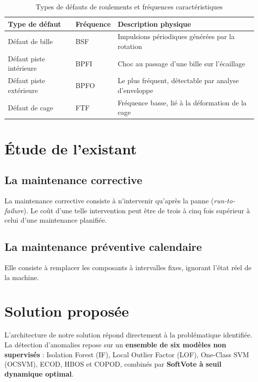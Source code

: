 \documentclass[12pt,a4paper]{report}
\begin{document}
\begin{table}[h]
\centering
\caption{Types de défauts de roulements et fréquences caractéristiques}
\label{tab:defauts_roulements}
\begin{tabular}{lll}
\toprule
\textbf{Type de défaut} & \textbf{Fréquence} & \textbf{Description physique} \\
\midrule
Défaut de bille        & BSF  & Impulsions périodiques générées par la rotation \\
Défaut piste intérieure & BPFI & Choc au passage d'une bille sur l'écaillage \\
Défaut piste extérieure & BPFO & Le plus fréquent, détectable par analyse d'enveloppe \\
Défaut de cage         & FTF  & Fréquence basse, lié à la déformation de la cage \\
\bottomrule
\end{tabular}
\end{table}

\section{Étude de l'existant}

\subsection{La maintenance corrective}
La maintenance corrective consiste à n'intervenir qu'après la panne (\textit{run-to-failure}).
Le coût d'une telle intervention peut être de trois à cinq fois supérieur à celui d'une maintenance planifiée.

\subsection{La maintenance préventive calendaire}
Elle consiste à remplacer les composants à intervalles fixes, ignorant l'état réel de la machine.

\section{Solution proposée}

L'architecture de notre solution répond directement à la problématique identifiée.
La détection d'anomalies repose sur un \textbf{ensemble de six modèles non supervisés} :
Isolation Forest (IF), Local Outlier Factor (LOF), One-Class SVM (OCSVM), ECOD,
HBOS et COPOD, combinés par \textbf{SoftVote à seuil dynamique optimal}.
\end{document}
